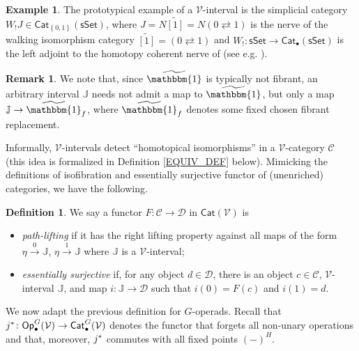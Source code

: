 \documentclass[a4paper,10pt
 ,final
]{article}%
\numberwithin{equation}{section}
\numberwithin{figure}{section}
\theoremstyle{definition} %
\newtheorem{definition}[equation]{Definition}%
\newtheorem{example}[equation]{Example}%
\newtheorem{remark}[equation]{Remark}%
\newcommand{\set}[1]{\left\{#1\right\}}%
\newcommand{\sSet}{\ensuremath{\mathsf{sSet}}}%
\newcommand{\Cat}{\mathsf{Cat}}
\newcommand{\V}{\ensuremath{\mathcal V}}
\newcommand{\1}{\ensuremath{\mathbbm 1}}%
\begin{document}
\begin{example}
	The prototypical example of a $\V$-interval is the simplicial category $W_!J \in \Cat_{\set{0,1}}(\sSet)$,
	where
	$J = N \widetilde{[1]} = N(0 \rightleftarrows 1) $ is the nerve of the walking isomorphism category 
	$\widetilde{[1]} =  (0 \rightleftarrows 1)$ and
	$W_! \colon \sSet \to \Cat_{\bullet}(\sSet)$ is the left adjoint to the homotopy coherent nerve
	of \cite{Cor82} (see e.g. \cite[\S 1]{Joy02}).
\end{example}



\begin{remark}
	We note that, since $\widetilde{\mathbbm{1}}$ is typically not fibrant,
	an arbitrary interval $\mathbb{J}$
	needs not admit a map to $\widetilde{\mathbbm{1}}$,
	but only a map $\mathbb{J} \to \widetilde{\mathbbm{1}}_f$,
	where $\widetilde{\mathbbm{1}}_f$ denotes some fixed chosen fibrant replacement.
\end{remark}



Informally, $\V$-intervals detect ``homotopical isomorphisms'' in a $\V$-category $\mathcal{C}$ 
(this idea is formalized in Definition \ref{EQUIV_DEF} below).
Mimicking the definitions of isofibration and essentially surjective functor of (unenriched) categories, we have the following.



\begin{definition}\label{PL_ES_DEFN}
We say a functor $F: \mathcal C \to \mathcal D$ in $\Cat(\V)$ is
\begin{itemize}
\item \textit{path-lifting}
	if it has the right lifting property against all maps of the form
	$\eta \xrightarrow{0} \mathbb{J}$, $\eta \xrightarrow{1} \mathbb{J}$
	where $\mathbb{J}$ is a $\V$-interval;
\item \textit{essentially surjective} 
	if, for any object $d \in \mathcal{D}$,
	there is an object $c \in \mathcal{C}$,
	$\V$-interval $\mathbb{J}$,
	and map $i \colon \mathbb{J} \to \mathcal D$
	such that $i(0) = F(c)$ and $i(1)=d$.
      \end{itemize}
\end{definition}



We now adapt the previous definition for $G$-operads.
Recall that $j^{\**} \colon \mathsf{Op}^G_\bullet(\V) \to \mathsf{Cat}^G_{\bullet}(\V)$
denotes the functor that forgets all non-unary operations and that, moreover, 
$j^{\**}$ commutes with all fixed points $(-)^H$.
\end{document}
